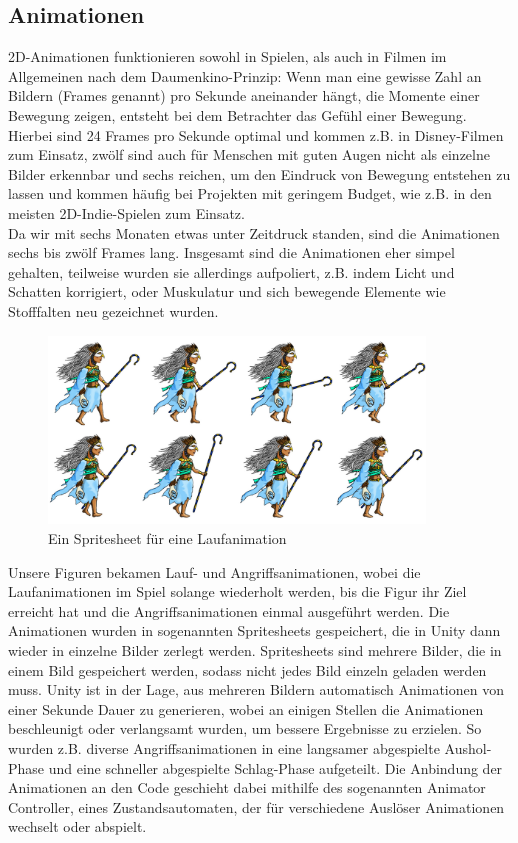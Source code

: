 \documentclass[extern,palatino]{cgBA}
\begin{document}
\subsection{Animationen}
2D-Animationen funktionieren sowohl in Spielen, als auch in Filmen im Allgemeinen nach dem Daumenkino-Prinzip: Wenn man eine gewisse Zahl an Bildern (Frames genannt) pro Sekunde aneinander hängt, die Momente einer Bewegung zeigen, entsteht bei dem Betrachter das Gefühl einer Bewegung. Hierbei sind 24 Frames pro Sekunde optimal und kommen z.B. in Disney-Filmen zum Einsatz, zwölf sind auch für Menschen mit guten Augen nicht als einzelne Bilder erkennbar und sechs reichen, um den Eindruck von Bewegung entstehen zu lassen und kommen häufig bei Projekten mit geringem Budget, wie z.B. in den meisten 2D-Indie-Spielen zum Einsatz. 
\\Da wir mit sechs Monaten etwas unter Zeitdruck standen, sind die Animationen sechs bis zwölf Frames lang. Insgesamt sind die Animationen eher simpel gehalten, teilweise wurden sie allerdings aufpoliert, z.B. indem Licht und Schatten korrigiert, oder Muskulatur und sich bewegende Elemente wie Stofffalten neu gezeichnet wurden.
\begin{figure}[H]
	\centering
	\includegraphics[height=5cm]{move1.jpg}
	\caption{Ein Spritesheet für eine Laufanimation}
\end{figure}
Unsere Figuren bekamen Lauf- und Angriffsanimationen, wobei die Laufanimationen im Spiel solange wiederholt werden, bis die Figur ihr Ziel erreicht hat und die Angriffsanimationen einmal ausgeführt werden. Die Animationen wurden in sogenannten Spritesheets gespeichert, die in Unity dann wieder in einzelne Bilder zerlegt werden. Spritesheets sind mehrere Bilder, die in einem Bild gespeichert werden, sodass nicht jedes Bild einzeln geladen werden muss. Unity ist in der Lage, aus mehreren Bildern automatisch Animationen von einer Sekunde Dauer zu generieren, wobei an einigen Stellen die Animationen beschleunigt oder verlangsamt wurden, um bessere Ergebnisse zu erzielen. So wurden z.B. diverse Angriffsanimationen in eine langsamer abgespielte Aushol-Phase und eine schneller abgespielte Schlag-Phase aufgeteilt. Die Anbindung der Animationen an den Code geschieht dabei mithilfe des sogenannten Animator Controller, eines Zustandsautomaten, der für verschiedene Auslöser Animationen wechselt oder abspielt.
\end{document}
